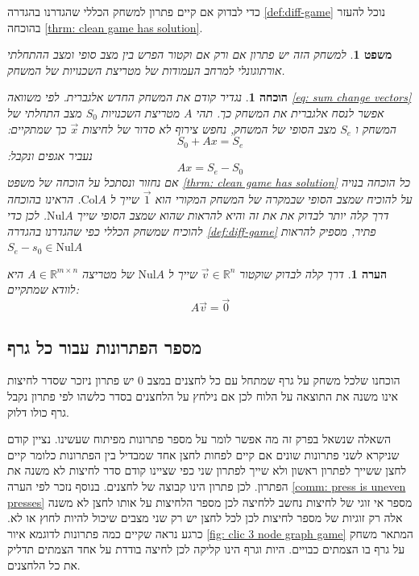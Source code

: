 \documentclass[12pt,leqno]{article}
\theoremstyle{theoremdd}
\newtheorem{theorem}{משפט}[section]
\newtheorem{comm}{הערה}[section]
\newtheorem*{prove}{הוכחה}
\newcommand{\Col}{\mathrm{Col}}
\newcommand{\Nul}{\mathrm{Nul}}
\begin{document}
כדי לבדוק אם קיים פתרון למשחק הכללי שהגדרנו 
בהגדרה 
\ref{def:diff-game}
נוכל להעזר בהוכחה
\ref{thrm: clean game has solution}.
\begin{theorem}
    למשחק הזה יש פתרון אם ורק אם וקטור הפרש בין מצב סופי ומצב ההתחלתי אורתוגונלי למרחב 
    העמודות של מטריצת השכנויות של המשחק.
\end{theorem}
\begin{prove}
    נגדיר קודם את המשחק החדש אלגברית.
    לפי משוואה 
    \ref{eq: sum change vectors}
    אפשר לנסח אלגברית את המשחק כך.
    תהי 
    $A$
    מטריצת השכנויות 
    $S_0$
    מצב התחלתי של המשחק 
    ו
    $S_e$
    מצב הסופי של המשחק,
    נחפש צירוף 
    לא סדור של לחיצות 
    $\vec x$
    כך שמתקיים:
    \[
        S_0 + Ax = S_e
    \]
    נעביר אגפים ונקבל:
    \[
         Ax = S_e - S_0
    \]
    אם נחזור ונסתכל על הוכחה
    של משפט 
    \ref{thrm: clean game has solution}
    כל הוכחה בנויה על להוכיח שמצב הסופי 
    שבמקרה של המשחק המקורי הוא 
    $\vec 1$
    שייך ל
    $\Col A$.
    הראינו בהוכחה דרך 
    קלה יותר לבדוק את את זה והיא
    להראות שהוא שמצב
    הסופי 
    שייך 
    $\Nul A$.
    לכן כדי להוכיח שמשחק הכללי כפי שהגדרנו 
    בהגדרה 
    \ref{def:diff-game}
    פתיר, 
    מספיק להראות 
    $S_e - s_0 \in \Nul A$
\end{prove}
\begin{comm}
    דרך קלה לבדוק שוקטור 
    $\vec v \in \mathbb{R}^{n}$
    שייך 
    ל
    $\Nul A$
    של מטריצה 
    $A \in \mathbb{R}^{m \times n}$
    היא לוודא שמתקיים:
    \[ A \vec v = \vec 0\]
\end{comm}
\subsection{מספר הפתרונות עבור כל גרף}
הוכחנו שלכל משחק על גרף שמתחל עם כל לחצנים במצב 
$0$
יש פתרון ניזכר שסדר לחיצות
אינו משנה את התוצאה על הלוח לכן אם נילחץ על הלחצנים בסדר כלשהו 
לפי פתרון נקבל גרף כולו דלוק.

השאלה  שנשאל בפרק זה מה אפשר לומר על מספר פתרונות מפיתוח שעשינו.
נציין קודם שניקרא לשני פתרונות שונים אם קיים לפחות לחצן אחד שמבדיל בין הפתרונות 
כלומר קיים לחצן ששייך לפתרון ראשון ולא שייך לפתרון שני כפי שציינו קודם סדר
לחיצות לא משנה את הפתרון.
לכן פתרון הינו קבוצה של לחצנים.
בנוסף נזכר לפי הערה
\ref{comm: press is uneven presses}
מספר אי זוגי של לחיצות נחשב ללחיצה לכן מספר הלחיצות על אותו לחצן לא משנה 
אלה רק זוגיות של מספר לחיצות 
לכן לכל לחצן יש רק שני מצבים שיכול להיות 
לחוץ 
או לא.
כרגע נראה שקיים כמה פתרונות לדוגמא 
איור
\ref{fig: clic 3 node graph game}
המתאר משחק על גרף בו הצמתים כבויים.
היות וגרף הינו קליקה לכן לחיצה בודדת על אחד הצמתים תדליק את כל הלחצנים.
\end{document}

